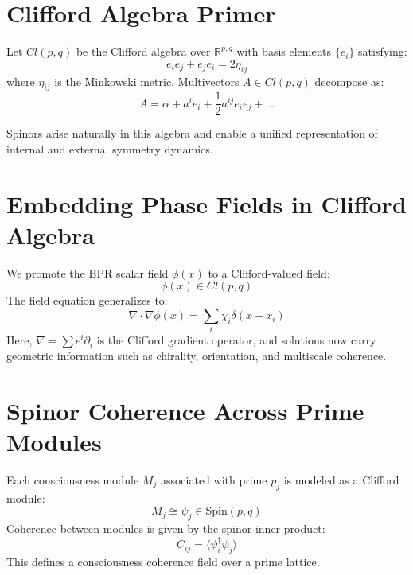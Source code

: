 \documentclass[12pt]{article}
\begin{document}
\section{Clifford Algebra Primer}

Let $Cl(p,q)$ be the Clifford algebra over $\mathbb{R}^{p,q}$ with basis elements $\{e_i\}$ satisfying:
\begin{equation}
    e_i e_j + e_j e_i = 2 \eta_{ij}
\end{equation}
where $\eta_{ij}$ is the Minkowski metric. Multivectors $A \in Cl(p,q)$ decompose as:
\begin{equation}
    A = \alpha + a^i e_i + \frac{1}{2} a^{ij} e_i e_j + \dots
\end{equation}

Spinors arise naturally in this algebra and enable a unified representation of internal and external symmetry dynamics.

\section{Embedding Phase Fields in Clifford Algebra}

We promote the BPR scalar field $\phi(x)$ to a Clifford-valued field:
\begin{equation}
    \phi(x) \in Cl(p,q)
\end{equation}
The field equation generalizes to:
\begin{equation}
    \nabla \cdot \nabla \phi(x) = \sum_i \chi_i \delta(x - x_i)
\end{equation}
Here, $\nabla = \sum e^i \partial_i$ is the Clifford gradient operator, and solutions now carry geometric information such as chirality, orientation, and multiscale coherence.

\section{Spinor Coherence Across Prime Modules}

Each consciousness module $M_j$ associated with prime $p_j$ is modeled as a Clifford module:
\begin{equation}
    M_j \cong \psi_j \in \text{Spin}(p,q)
\end{equation}
Coherence between modules is given by the spinor inner product:
\begin{equation}
    C_{ij} = \langle \psi_i^\dagger \psi_j \rangle
\end{equation}
This defines a consciousness coherence field over a prime lattice.
\end{document}
